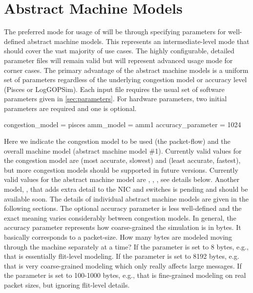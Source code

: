 
\section{Abstract Machine Models}
\label{sec:amm}

The preferred mode for usage of \sstmacro will be through specifying parameters for well-defined abstract machine models.
This represents an intermediate-level mode that should cover the vast majority of use cases.
The highly configurable, detailed parameter files will remain valid but will represent advanced usage mode for corner cases.
The primary advantage of the abstract machine models is a uniform set of parameters regardless of the underlying congestion model or accuracy level (Pisces or LogGOPSim).
Each input file requires the usual set of software parameters given in \ref{sec:parameters}.
For hardware parameters, two initial parameters are required and one is optional.

\begin{ViFile}
congestion_model = pisces
amm_model = amm1
accuracy_parameter = 1024
\end{ViFile} 

Here we indicate the congestion model to be used (the packet-flow) and the overall machine model (abstract machine model \#1).
Currently valid values for the congestion model are  (most accurate, slowest) and  (least accurate, fastest),
but more congestion models should be supported in future versions.
Currently valid values for the abstract machine model are , , , see details below. 
Another model, , that adds extra detail to the NIC and switches is pending and should be available soon.
The details of individual abstract machine models are given in the following sections.
The optional accuracy parameter is less well-defined and the exact meaning varies considerably between congestion models.
In general, the accuracy parameter represents how coarse-grained the simulation is in bytes.
It basically corresponds to a packet-size. How many bytes are modeled moving through the machine separately at a time?
If the parameter is set to 8 bytes, e.g., that is essentially flit-level modeling.
If the parameter is set to 8192 bytes, e.g. that is very coarse-grained modeling which only really affects large messages.
If the parameter is set to 100-1000 bytes, e.g., that is fine-grained modeling on real packet sizes, but ignoring flit-level details.

